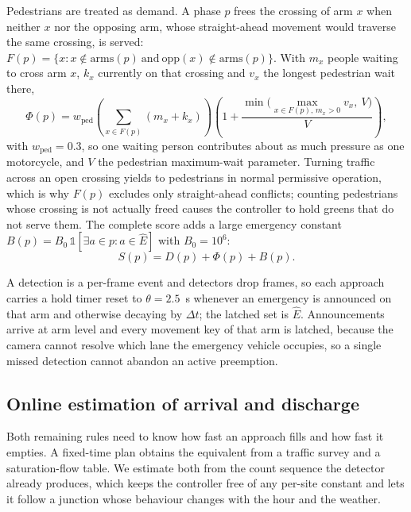 \documentclass[journal]{IEEEtran}
\begin{document}
Pedestrians are treated as demand. A phase $p$ frees the crossing of arm $x$ when neither $x$ nor the
opposing arm, whose straight-ahead movement would traverse the same crossing, is served:
$F(p) = \{x : x \notin \mathrm{arms}(p) \ \text{and}\ \mathrm{opp}(x) \notin \mathrm{arms}(p)\}$.
With $m_x$ people waiting to cross arm $x$, $k_x$ currently on that crossing and $v_x$ the longest
pedestrian wait there,
\begin{equation}
\Phi(p) = w_{\mathrm{ped}} \left( \sum_{x \in F(p)} (m_x + k_x) \right)
\left( 1 + \frac{\min\big(\max_{x \in F(p),\, m_x > 0} v_x,\ V\big)}{V} \right),
\label{eq:pedpressure}
\end{equation}
with $w_{\mathrm{ped}} = 0.3$, so one waiting person contributes about as much pressure as one
motorcycle, and $V$ the pedestrian maximum-wait parameter. Turning traffic across an open crossing
yields to pedestrians in normal permissive operation, which is why $F(p)$ excludes only
straight-ahead conflicts; counting pedestrians whose crossing is not actually freed causes the
controller to hold greens that do not serve them. The complete score adds a large emergency constant
$B(p) = B_0 \, \mathbb{1}[\exists a \in p : a \in \hat{E}]$ with $B_0 = 10^6$:
\begin{equation}
S(p) = D(p) + \Phi(p) + B(p).
\label{eq:score}
\end{equation}

A detection is a per-frame event and detectors drop frames, so each approach carries a hold timer reset to
$\theta = 2.5$~s whenever an emergency is announced on that arm and otherwise decaying by $\Delta t$; the
latched set is $\hat{E}$. Announcements arrive at arm level and every movement key of that arm is latched,
because the camera cannot resolve which lane the emergency vehicle occupies, so a single missed detection
cannot abandon an active preemption.

\subsection{Online estimation of arrival and discharge}
\label{sec:estimation}

Both remaining rules need to know how fast an approach fills and how fast it empties. A fixed-time
plan obtains the equivalent from a traffic survey and a saturation-flow table. We estimate both from
the count sequence the detector already produces, which keeps the controller free of any per-site
constant and lets it follow a junction whose behaviour changes with the hour and the weather.
\end{document}
